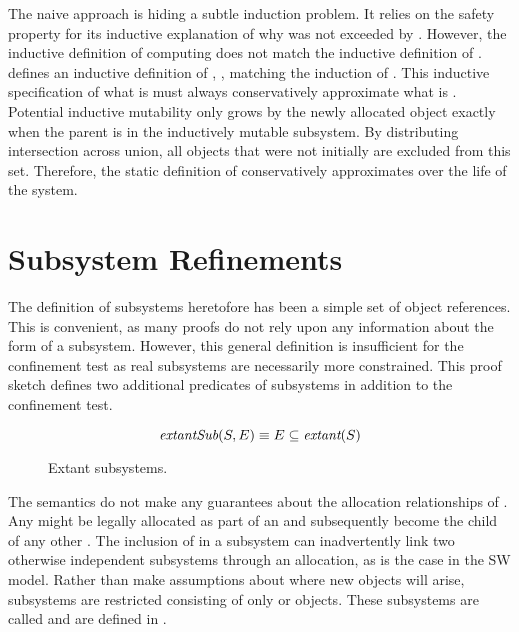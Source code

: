 The naive approach is hiding a subtle induction problem.
It relies on the safety property for its inductive explanation of why \NMmutable{} was not exceeded by \NMmutated{}.
However, the inductive definition of computing \NMmutable{} does not match the inductive definition of \NMmutated.
 defines an inductive definition of \NMmutable{}, \NMmutableInd{}, matching the induction of \NMmutated{}.
This inductive specification of what is \TMmutable{} must always conservatively approximate what is \TMmutated{}.
Potential inductive mutability only grows by the newly allocated object exactly when the parent is in the inductively mutable subsystem.
By distributing intersection across union, all objects that were not initially \TMextant{} are excluded from this set.
Therefore, the static definition of \NMmutable{} conservatively approximates \TMmutation{} over the life of the system.

\section{Subsystem Refinements}

The definition of subsystems heretofore has been a simple set of object references.
This is convenient, as many proofs do not rely upon any information about the form of a subsystem.
However, this general definition is insufficient for the confinement test as real subsystems are necessarily more constrained.
This proof sketch defines two additional predicates of subsystems in addition to the confinement test.

\begin{figure}
  \[ \textit{extantSub}(S,E) \equiv E \subseteq \textit{extant}(S) \]
  \caption{Extant subsystems.\label{fig:sketch:extant}}
\end{figure}

The semantics do not make any guarantees about the allocation relationships of \TMunborn{} \TMobjs{}.
Any \TMunborn{} \TMobj{} might be legally allocated as part of an \TMallocate{} \TMop{} and subsequently become the child of any other \TMobj{}.
The inclusion of \TMunborn{} \TMobjs{} in a subsystem can inadvertently link two otherwise independent subsystems through an allocation, as is the case in the SW model\cite{ShapiroWeber2000}.
Rather than make assumptions about where new objects will arise, subsystems are restricted consisting of only \TMalive{} or \TMdead{} objects.
These subsystems are called \term{\TMextantSubs} and are defined in .

